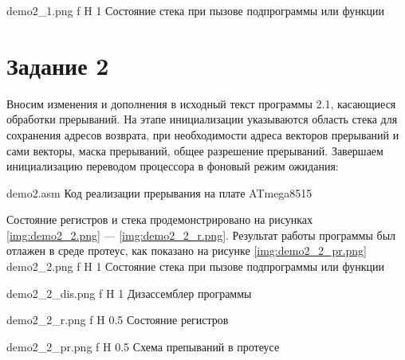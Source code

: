 \documentclass{bmstu}
\begin{document}
    {demo2_1.png} %
    {f} %
    {H} %
    {1\textwidth} %
    {Состояние стека при пызове подпрограммы или функции} 



\section{Задание 2}
Вносим изменения  и дополнения в исходный текст программы 2.1, касающиеся обработки прерываний. На этапе инициализации указываются область стека для сохранения адресов возврата, при необходимости адреса векторов прерываний и сами векторы, маска прерываний, общее разрешение прерываний. Завершаем инициализацию переводом процессора в фоновый режим ожидания:

	{demo2.asm}
	{Код реализации прерывания на плате ATmega8515}

Состояние регистров и стека продемонстрировано на рисунках \ref{img:demo2_2.png} --- \ref{img:demo2_2_r.png}.
Результат работы программы был отлажен в среде протеус, как показано на рисунке \ref{img:demo2_2_pr.png}
    {demo2_2.png} %
    {f} %
    {H} %
    {1\textwidth} %
    {Состояние стека при пызове подпрограммы или функции} 
    

    {demo2_2_dis.png} %
    {f} %
    {H} %
    {1\textwidth} %
    {Дизассемблер программы}     
    

    {demo2_2_r.png} %
    {f} %
    {H} %
    {0.5\textwidth} %
    {Состояние регистров} 


    {demo2_2_pr.png} %
    {f} %
    {H} %
    {0.5\textwidth} %
    {Схема препываний в протеусе} 
\end{document}
